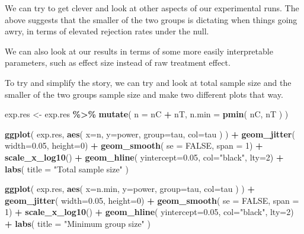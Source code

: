 \documentclass[
]{book}
\newenvironment{Shaded}{\begin{snugshade}}{\end{snugshade}}
\newcommand{\AttributeTok}[1]{\textcolor[rgb]{0.13,0.29,0.53}{#1}}
\newcommand{\ConstantTok}[1]{\textcolor[rgb]{0.56,0.35,0.01}{#1}}
\newcommand{\DecValTok}[1]{\textcolor[rgb]{0.00,0.00,0.81}{#1}}
\newcommand{\FloatTok}[1]{\textcolor[rgb]{0.00,0.00,0.81}{#1}}
\newcommand{\FunctionTok}[1]{\textcolor[rgb]{0.13,0.29,0.53}{\textbf{#1}}}
\newcommand{\NormalTok}[1]{#1}
\newcommand{\OtherTok}[1]{\textcolor[rgb]{0.56,0.35,0.01}{#1}}
\newcommand{\SpecialCharTok}[1]{\textcolor[rgb]{0.81,0.36,0.00}{\textbf{#1}}}
\newcommand{\StringTok}[1]{\textcolor[rgb]{0.31,0.60,0.02}{#1}}
\begin{document}
We can try to get clever and look at other aspects of our experimental runs.
The above suggests that the smaller of the two groups is dictating when things
going awry, in terms of elevated rejection rates under the null.

We can also look at our results in terms of some more easily interpretable parameters, such as effect size instead of raw treatment effect.

To try and simplify the story, we can try and look at total sample size and the smaller of
the two groups sample size and make two different plots that way.

\begin{Shaded}
\begin{Highlighting}[]
\NormalTok{exp.res }\OtherTok{\textless{}{-}}\NormalTok{ exp.res }\SpecialCharTok{\%\textgreater{}\%} 
  \FunctionTok{mutate}\NormalTok{( }\AttributeTok{n =}\NormalTok{ nC }\SpecialCharTok{+}\NormalTok{ nT,}
          \AttributeTok{n.min =} \FunctionTok{pmin}\NormalTok{( nC, nT ) )}
\end{Highlighting}
\end{Shaded}

\begin{Shaded}
\begin{Highlighting}[]
\FunctionTok{ggplot}\NormalTok{( exp.res, }\FunctionTok{aes}\NormalTok{( }\AttributeTok{x=}\NormalTok{n, }\AttributeTok{y=}\NormalTok{power, }\AttributeTok{group=}\NormalTok{tau, }\AttributeTok{col=}\NormalTok{tau ) ) }\SpecialCharTok{+}
  \FunctionTok{geom\_jitter}\NormalTok{( }\AttributeTok{width=}\FloatTok{0.05}\NormalTok{, }\AttributeTok{height=}\DecValTok{0}\NormalTok{) }\SpecialCharTok{+}
  \FunctionTok{geom\_smooth}\NormalTok{( }\AttributeTok{se =} \ConstantTok{FALSE}\NormalTok{, }\AttributeTok{span =} \DecValTok{1}\NormalTok{) }\SpecialCharTok{+}
  \FunctionTok{scale\_x\_log10}\NormalTok{() }\SpecialCharTok{+}
  \FunctionTok{geom\_hline}\NormalTok{( }\AttributeTok{yintercept=}\FloatTok{0.05}\NormalTok{, }\AttributeTok{col=}\StringTok{"black"}\NormalTok{, }\AttributeTok{lty=}\DecValTok{2}\NormalTok{) }\SpecialCharTok{+}
  \FunctionTok{labs}\NormalTok{( }\AttributeTok{title =} \StringTok{"Total sample size"}\NormalTok{ )}

\FunctionTok{ggplot}\NormalTok{( exp.res, }\FunctionTok{aes}\NormalTok{( }\AttributeTok{x=}\NormalTok{n.min, }\AttributeTok{y=}\NormalTok{power, }\AttributeTok{group=}\NormalTok{tau, }\AttributeTok{col=}\NormalTok{tau ) ) }\SpecialCharTok{+}
  \FunctionTok{geom\_jitter}\NormalTok{( }\AttributeTok{width=}\FloatTok{0.05}\NormalTok{, }\AttributeTok{height=}\DecValTok{0}\NormalTok{) }\SpecialCharTok{+}
  \FunctionTok{geom\_smooth}\NormalTok{( }\AttributeTok{se =} \ConstantTok{FALSE}\NormalTok{, }\AttributeTok{span =} \DecValTok{1}\NormalTok{) }\SpecialCharTok{+}
  \FunctionTok{scale\_x\_log10}\NormalTok{() }\SpecialCharTok{+}
  \FunctionTok{geom\_hline}\NormalTok{( }\AttributeTok{yintercept=}\FloatTok{0.05}\NormalTok{, }\AttributeTok{col=}\StringTok{"black"}\NormalTok{, }\AttributeTok{lty=}\DecValTok{2}\NormalTok{) }\SpecialCharTok{+}
  \FunctionTok{labs}\NormalTok{( }\AttributeTok{title =} \StringTok{"Minimum group size"}\NormalTok{ )}
\end{Highlighting}
\end{Shaded}
\end{document}
